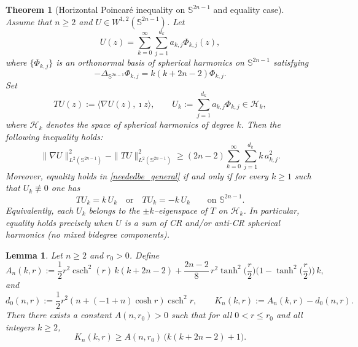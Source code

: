 \documentclass[10pt,a4paper]{amsart}
\newtheorem{theorem}{Theorem}
\newtheorem{lemma}{Lemma}
\newcommand{\csch}{\operatorname{csch}}
\def\ge{\geqslant}
\begin{document}
\begin{theorem}[Horizontal Poincar\'e inequality on $\mathbb S^{2n-1}$ and equality case]\label{prop23_general}
Assume that $n\ge 2$ and $U\in W^{1,2}(\mathbb{S}^{2n-1})$. Let
\[
U(z)=\sum_{k=0}^\infty\sum_{j=1}^{d_k} a_{k,j}\Phi_{k,j}(z),
\]
where $\{\Phi_{k,j}\}$ is an orthonormal basis of spherical harmonics on
$\mathbb S^{2n-1}$ satisfying
\[
-\Delta_{\mathbb S^{2n-1}}\Phi_{k,j}=k(k+2n-2)\Phi_{k,j}.
\]
Set
\[
TU(z):=\langle \nabla U(z),\imath z\rangle,
\qquad
U_k:=\sum_{j=1}^{d_k} a_{k,j}\Phi_{k,j}\in\mathcal H_k,
\]
where $\mathcal H_k$ denotes the space of spherical harmonics of degree $k$.
Then the following inequality holds:
\begin{equation}\label{neededbe_general}
\|\nabla U\|_{L^2(\mathbb S^{2n-1})}^2
-\|TU\|_{L^2(\mathbb S^{2n-1})}^2
\ge (2n-2)\sum_{k=0}^\infty\sum_{j=1}^{d_k} k\,a_{k,j}^2.
\end{equation}
Moreover, equality holds in \eqref{neededbe_general} if and only if for every $k\ge 1$
such that $U_k\not\equiv 0$ one has
\begin{equation}\label{eq:equality_condition_T}
TU_k = k\,U_k \quad \text{or}\quad TU_k = -k\,U_k
\qquad \text{on }\mathbb S^{2n-1}.
\end{equation}
Equivalently, each $U_k$ belongs to the $\pm k$--eigenspace of $T$ on $\mathcal H_k$.
In particular, equality holds precisely when $U$ is a sum of CR and/or anti-CR spherical
harmonics (no mixed bidegree components).
\end{theorem}

\begin{lemma}\label{lem:Anr0}
Let $n\ge 2$ and $r_0>0$. Define
\[
A_n(k,r):=
\frac12 r^2\csch^2(r)\,k(k+2n-2)
+\frac{2n-2}{8}\, r^2 \tanh^2\!\Big(\frac r2\Big)
\Big(1-\tanh^2\!\Big(\frac r2\Big)\Big)\,k,
\]
and
\[
d_0(n,r):=\frac{1}{2}r^{2}\left(n+(-1+n)\cosh r\right)\csch^{2}r,
\qquad
K_n(k,r):=A_n(k,r)-d_0(n,r).
\]
Then there exists a constant $A(n,r_0)>0$ such that for all $0<r\le r_0$ and all integers $k\ge 2$,
\begin{equation}\label{Kn_lower}
K_n(k,r)\ge A(n,r_0)\,\big(k(k+2n-2)+1\big).
\end{equation}
\end{lemma}
\end{document}
